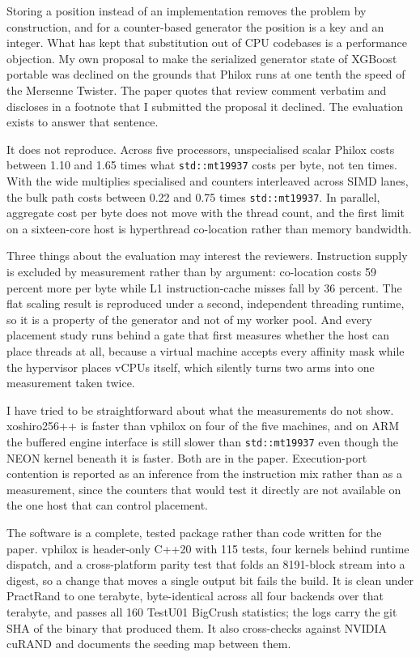 \documentclass[11pt,a4paper]{article}
\begin{document}
Storing a position instead of an implementation removes the problem by
construction, and for a counter-based generator the position is a key and an
integer. What has kept that substitution out of CPU codebases is a performance
objection. My own proposal to make the serialized generator state of XGBoost
portable was declined on the grounds that Philox runs at one tenth the speed of
the Mersenne Twister. The paper quotes that review comment verbatim and
discloses in a footnote that I submitted the proposal it declined. The
evaluation exists to answer that sentence.

It does not reproduce. Across five processors, unspecialised scalar Philox costs
between 1.10 and 1.65 times what \texttt{std::mt19937} costs per byte, not ten
times. With the wide multiplies specialised and counters interleaved across SIMD
lanes, the bulk path costs between 0.22 and 0.75 times \texttt{std::mt19937}. In
parallel, aggregate cost per byte does not move with the thread count, and the
first limit on a sixteen-core host is hyperthread co-location rather than memory
bandwidth.

Three things about the evaluation may interest the reviewers. Instruction supply
is excluded by measurement rather than by argument: co-location costs 59 percent
more per byte while L1 instruction-cache misses fall by 36 percent. The flat
scaling result is reproduced under a second, independent threading runtime, so
it is a property of the generator and not of my worker pool. And every placement
study runs behind a gate that first measures whether the host can place threads
at all, because a virtual machine accepts every affinity mask while the
hypervisor places vCPUs itself, which silently turns two arms into one
measurement taken twice.

I have tried to be straightforward about what the measurements do not show.
xoshiro256++ is faster than vphilox on four of the five machines, and on ARM the
buffered engine interface is still slower than \texttt{std::mt19937} even though
the NEON kernel beneath it is faster. Both are in the paper. Execution-port
contention is reported as an inference from the instruction mix rather than as a
measurement, since the counters that would test it directly are not available on
the one host that can control placement.

The software is a complete, tested package rather than code written for the
paper. vphilox is header-only C++20 with 115 tests, four kernels behind runtime
dispatch, and a cross-platform parity test that folds an 8191-block stream into
a digest, so a change that moves a single output bit fails the build. It is
clean under PractRand to one terabyte, byte-identical across all four backends
over that terabyte, and passes all 160 TestU01 BigCrush statistics; the logs
carry the git SHA of the binary that produced them. It also cross-checks against
NVIDIA cuRAND and documents the seeding map between them.
\end{document}

